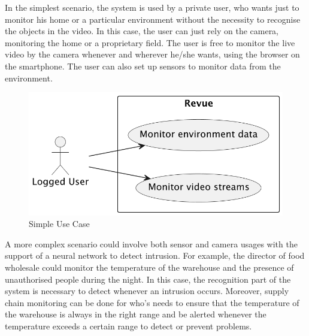 \documentclass{scrartcl}
\begin{document}
    In the simplest scenario, the system is used by a private user, who wants just to monitor his home or a particular environment without the necessity
    to recognise the objects in the video. In this case, the user can just rely on the camera, monitoring the home or a proprietary field. The user is free to monitor the live video by the camera whenever and wherever he/she wants, using the browser on the smartphone.
    The user can also set up sensors to monitor data from the environment.

    \begin{figure}
        \centering
        \includegraphics[scale=0.6]{img/simple-use-case}
        \caption{Simple Use Case}
        \label{fig:simple-use-case}
    \end{figure}

    A more complex scenario could involve both sensor and camera usages with the support of a neural network to detect intrusion. For example, the director of food wholesale could
    monitor the temperature of the warehouse and the presence of unauthorised people during the night. In this case, the
    recognition part of the system is necessary to detect whenever an intrusion occurs.
    Moreover, supply chain monitoring can be done for who's needs to ensure that the temperature of
    the warehouse is always in the right range and be alerted whenever the temperature exceeds a certain range to detect or
    prevent problems.
\end{document}
